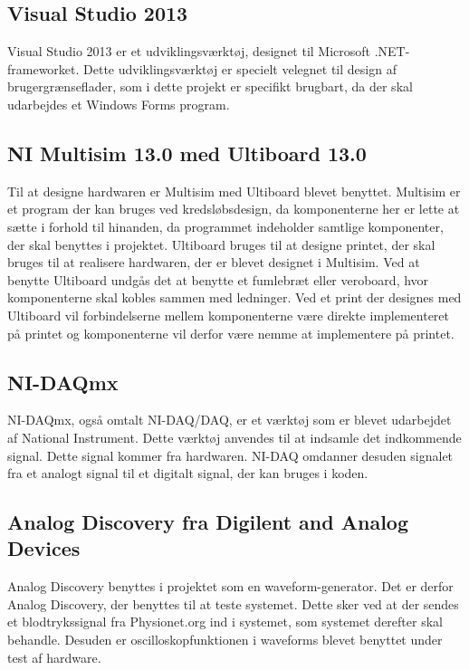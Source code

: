 \subsection{Visual Studio 2013}
Visual Studio 2013 er et udviklingsværktøj, designet til Microsoft .NET-frameworket. Dette udviklingsværktøj er specielt velegnet til design af brugergrænseflader, som i dette projekt er specifikt brugbart, da der skal udarbejdes et Windows Forms program.
\subsection{NI Multisim 13.0 med Ultiboard 13.0}
Til at designe hardwaren er Multisim med Ultiboard blevet benyttet. Multisim er et program der kan bruges ved kredsløbsdesign, da komponenterne her er lette at sætte i forhold til hinanden, da programmet indeholder samtlige komponenter, der skal benyttes i projektet. Ultiboard bruges til at designe printet, der skal bruges til at realisere hardwaren, der er blevet designet i Multisim. Ved at benytte Ultiboard undgås det at benytte et fumlebræt eller veroboard, hvor komponenterne skal kobles sammen med ledninger. Ved et print der designes med Ultiboard vil forbindelserne mellem komponenterne være direkte implementeret på printet og komponenterne vil derfor være nemme at implementere på printet.
\subsection{NI-DAQmx}
NI-DAQmx, også omtalt NI-DAQ/DAQ, er et værktøj som er blevet udarbejdet af National Instrument. Dette værktøj anvendes til at indsamle det indkommende signal. Dette signal kommer fra hardwaren. NI-DAQ omdanner desuden signalet fra et analogt signal til et digitalt signal, der kan bruges i koden. 
\subsection{Analog Discovery fra Digilent and Analog Devices}
Analog Discovery benyttes i projektet som en waveform-generator. Det er derfor Analog Discovery, der benyttes til at teste systemet. Dette sker ved at der sendes et blodtrykssignal fra Physionet.org ind i systemet, som systemet derefter skal behandle. Desuden er oscilloskopfunktionen i waveforms blevet benyttet under test af hardware.
